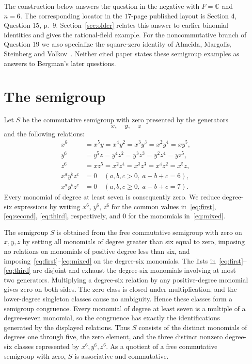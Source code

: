 \documentclass[11pt]{article}
\newcommand{\C}{\mathbb C}
\begin{document}
The construction below answers the question in the negative with $F=\C$
and $n=6$. The corresponding locator in the $17$-page published layout
is Section 4, Question 15, p.\ 9.
Section~\ref{sec:older} relates this answer to earlier binomial identities
and gives the rational-field example. For the noncommutative branch of
Question 19 we also specialize the square-zero identity of Almeida,
Margolis, Steinberg and Volkov~\cite[p.\ 11, proof of Proposition 3.4]{AMSV}.
Neither cited paper states these semigroup examples as answers to
Bergman's later questions.

\section{The semigroup}
Let $S$ be the commutative semigroup with zero presented by the generators
\begin{equation}\label{eq:generators}
x,\quad y,\quad z
\end{equation}
and the following relations:
\begin{align}
x^6&=x^5y=x^4y^2=x^3y^3=x^2y^4=xy^5,\label{eq:first}\\
y^6&=y^5z=y^4z^2=y^3z^3=y^2z^4=yz^5,\label{eq:second}\\
z^6&=xz^5=x^2z^4=x^3z^3=x^4z^2=x^5z,\label{eq:third}\\
x^ay^bz^c&=0\quad(a,b,c>0,\ a+b+c=6),\label{eq:mixed}\\
x^ay^bz^c&=0\quad(a,b,c\geq0,\ a+b+c=7).\label{eq:seven}
\end{align}
Every monomial of degree at least seven is consequently zero. We reduce
degree-six expressions by writing $x^6$, $y^6$, $z^6$ for the common values
in~\eqref{eq:first}, \eqref{eq:second}, \eqref{eq:third}, respectively, and
$0$ for the monomials in~\eqref{eq:mixed}.

The semigroup $S$ is obtained from the free commutative semigroup with zero
on $x,y,z$ by setting all monomials of degree greater than six equal to
zero, imposing no relations on monomials of positive degree less than
six, and imposing~\eqref{eq:first}--\eqref{eq:mixed} on the degree-six
monomials. The lists in~\eqref{eq:first}--\eqref{eq:third} are disjoint
and exhaust the degree-six monomials involving at most two generators.
Multiplying a degree-six relation by any positive-degree monomial gives
zero on both sides. The zero class is closed under multiplication, and
the lower-degree singleton classes cause no ambiguity. Hence these
classes form a semigroup congruence. Every monomial of degree at least
seven is a multiple of a degree-seven monomial, so the congruence has
exactly the identifications generated by the displayed relations.
Thus $S$ consists of the distinct monomials of degrees one through five,
the zero element, and the three distinct nonzero degree-six classes
represented by $x^6,y^6,z^6$. As a quotient of a free commutative semigroup
with zero, $S$ is associative and commutative.
\end{document}
